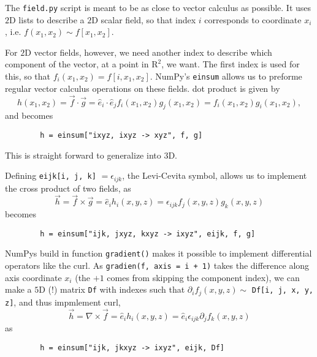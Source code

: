 \documentclass{article}
\begin{document}
    The \verb|field.py| script is meant to be as close to vector calculus as possible. It uses $2\textrm{D}$ lists to describe a $2\textrm{D}$ scalar field, so that index $i$ corresponds to coordinate $x_i$, i.e. $f(x_1, x_2) \sim f[x_1, x_2]$.
    
    For $2\textrm{D}$ vector fields, however, we need another index to describe which component of the vector, at a point in $\textrm{R}^2$, we want. The first index is used for this, so that $f_i(x_1, x_2) = f[i, x_1, x_2]$. NumPy's \verb|einsum| allows us to preforme regular vector calculus operations on these fields. dot product is given by
    $$
    h(x_1, x_2) = \vec f\cdot \vec g = \hat e_i \cdot \hat e_j f_i(x_1, x_2)  g_j(x_1, x_2) = f_i(x_1, x_2)g_i(x_1, x_2),
    $$
    and becomes
    \begin{verbatim}
        h = einsum["ixyz, ixyz -> xyz", f, g]
    \end{verbatim}
    This is straight forward to generalize into 3D. 

    Defining \verb|eijk[i, j, k]| $ = \epsilon_{ijk}$, the Levi-Cevita symbol, allows us to implement the cross product of two fields, as
    $$
        \vec h = \vec f \times \vec g = \hat e_i h_i(x, y, z) =  \epsilon_{ijk} f_j(x, y, z) g_k(x, y, z)
    $$
    becomes
    \begin{verbatim}
        h = einsum["ijk, jxyz, kxyz -> ixyz", eijk, f, g]
    \end{verbatim}
    NumPys build in function \verb|gradient()| makes it possible to implement differential operators like the curl. As \verb|gradien(f, axis = i + 1)| takes the difference along axis coordinate $x_i$ (the $+1$ comes from skipping the component index), we can make a $5 \textrm{D}$ (!) matrix \verb|Df| with indexes such that $\partial_i f_j(x, y, z)\sim$ \verb|Df[i, j, x, y, z]|, and thus impmlement curl,
    $$
        \vec h = \nabla \times \vec f = \hat e_i h_i(x, y, z) =  \hat e_i \epsilon_{ijk} \partial_j f_k(x, y, z)
    $$
    as
    \begin{verbatim}
        h = einsum["ijk, jkxyz -> ixyz", eijk, Df]
    \end{verbatim}
\end{document}

